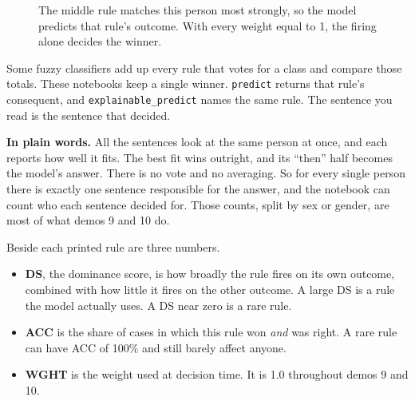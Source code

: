 \documentclass[11pt]{article}
\newcommand{\fn}[1]{\texttt{\small #1}}
\begin{document}
\begin{figure}[H]
\centering
{}
\caption{The middle rule matches this person most strongly, so the model predicts that rule's outcome. With every weight equal to 1, the firing alone decides the winner.}
\end{figure}

Some fuzzy classifiers add up every rule that votes for a class and compare those totals. These notebooks keep a single winner. \fn{predict} returns that rule's consequent, and \fn{explainable\_predict} names the same rule. The sentence you read is the sentence that decided.

\begin{plainwords}
\textbf{In plain words.} All the sentences look at the same person at once, and each reports how well it fits. The best fit wins outright, and its ``then'' half becomes the model's answer. There is no vote and no averaging. So for every single person there is exactly one sentence responsible for the answer, and the notebook can count who each sentence decided for. Those counts, split by sex or gender, are most of what demos 9 and 10 do.
\end{plainwords}

Beside each printed rule are three numbers.

\begin{itemize}
  \item \textbf{DS}, the dominance score, is how broadly the rule fires on its own outcome, combined with how little it fires on the other outcome. A large DS is a rule the model actually uses. A DS near zero is a rare rule.
  \item \textbf{ACC} is the share of cases in which this rule won \emph{and} was right. A rare rule can have ACC of 100\% and still barely affect anyone.
  \item \textbf{WGHT} is the weight used at decision time. It is 1.0 throughout demos 9 and 10.
\end{itemize}
\end{document}
